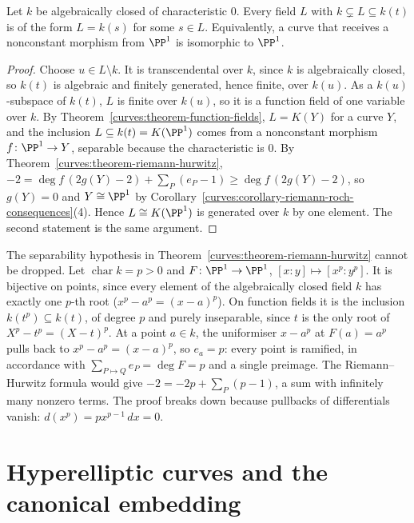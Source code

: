 \begin{corollary}[L\"uroth]\label{curves:corollary-luroth}
Let $k$ be algebraically closed of characteristic $0$. Every field $L$ with $k \subsetneq L \subseteq k(t)$ is of the form $L = k(s)$ for some $s \in L$. Equivalently, a curve that receives a nonconstant morphism from
$\PP^1$ is isomorphic to $\PP^1$.
\end{corollary}

\begin{proof}
Choose $u \in L \setminus k$. It is transcendental over $k$, since $k$ is algebraically closed, so $k(t)$ is algebraic and finitely generated, hence finite, over $k(u)$. As a $k(u)$-subspace of $k(t)$, $L$ is finite over
$k(u)$, so it is a function field of one variable over $k$. By Theorem~\ref{curves:theorem-function-fields}, $L = K(Y)$ for a curve $Y$, and the inclusion $L \subseteq k(t) = K(\PP^1)$ comes from a nonconstant
morphism $f \colon \PP^1 \to Y$, separable because the characteristic is $0$. By Theorem~\ref{curves:theorem-riemann-hurwitz}, $-2 = \deg f\,(2g(Y) - 2) + \sum_P(e_P - 1) \geq \deg f\,(2g(Y) - 2)$, so $g(Y) = 0$
and $Y \cong \PP^1$ by Corollary~\ref{curves:corollary-riemann-roch-consequences}(4). Hence $L \cong K(\PP^1)$ is generated over $k$ by one element. The second statement is the same argument.
\end{proof}

\begin{counterexample}\label{curves:counterexample-frobenius}
The separability hypothesis in Theorem~\ref{curves:theorem-riemann-hurwitz} cannot be dropped. Let $\operatorname{char}k = p > 0$ and $F \colon \PP^1 \to \PP^1$, $[x : y] \mapsto [x^p : y^p]$. It is bijective on points,
since every element of the algebraically closed field $k$ has exactly one $p$-th root ($x^p - a^p = (x - a)^p$). On function fields it is the inclusion $k(t^p) \subseteq k(t)$, of degree $p$ and purely inseparable, since
$t$ is the only root of $X^p - t^p = (X - t)^p$. At a point $a \in k$, the uniformiser $x - a^p$ at $F(a) = a^p$ pulls back to $x^p - a^p = (x - a)^p$, so $e_a = p$: every point is ramified, in accordance with
$\sum_{P \mapsto Q}e_P = \deg F = p$ and a single preimage. The Riemann--Hurwitz formula would give $-2 = -2p + \sum_P(p - 1)$, a sum with infinitely many nonzero terms. The proof breaks down because pullbacks of
differentials vanish: $d(x^p) = px^{p-1}\,dx = 0$.
\end{counterexample}

\section{Hyperelliptic curves and the canonical embedding}\label{curves:section-canonical}

